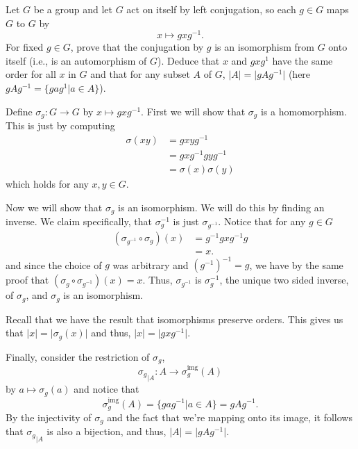 \documentclass[12 pt, letterpaper]{hmcpset}
\begin{document}
\pagebreak

\begin{problem}
	Let $G$ be a group and let $G$ act on itself by left conjugation, so each $g \in G$ maps $G$ to $G$ by
	\[
		x \mapsto g x g^{-1}.
	\]
	For fixed $g \in G$, prove that the conjugation by $g$ is an isomorphism from $G$ onto itself (i.e., is an automorphism of $G$). Deduce that $x$ and $g x g^{1}$ have the same order for all $x$ in $G$ and that for any subset $A$ of $G$, $\lvert A \rvert = \lvert g A g^{-1} \rvert$ (here $g A g^{-1} = \{ g a g^{1} | a \in A \} $).
\end{problem}

\begin{solution}
	Define $\sigma_g : G \to G$ by $x \mapsto g x g^{-1}$. First we will show that $\sigma_g$ is a homomorphism. This is just by computing
	\[
		\begin{split}
			\sigma(xy) & = g x y g^{-1} \\
				   & = g x g^{-1} g y g^{-1} \\
				   & = \sigma(x) \sigma(y)
		\end{split}
	\]
	which holds for any $x, y \in G$. 

	Now we will show that $\sigma_g$ is an isomorphism. We will do this by finding an inverse. We claim specifically, that $\sigma_g^{-1}$ is just $\sigma_{g^{-1}}$. Notice that for any $g \in G$
	\[
		\begin{split}
			(\sigma_{g^{-1}} \circ \sigma_g)(x) & = g^{-1} g x g^{-1} g \\
							    & = x.
		\end{split}
	\]
	and since the choice of $g$ was arbitrary and $(g^{-1})^{-1} = g$, we have by the same proof that $(\sigma_g \circ \sigma_{g^{-1}})(x) = x$. Thus, $\sigma_{g^{-1}}$ is $\sigma_g^{-1}$, the unique two sided inverse, of $\sigma_g$, and $\sigma_g$ is an isomorphism. 

	Recall that we have the result that isomorphisms preserve orders. This gives us that $\lvert x \rvert = \lvert \sigma_g(x) \rvert$ and thus, $\lvert x \rvert = \lvert g x g^{-1} \rvert$. 

	Finally, consider the restriction of $\sigma_g$, 
	\[
		{\sigma_g}_{|A} : A \to \sigma_g^\text{img}(A)
	\]
	by $a \mapsto \sigma_g(a)$ and notice that
	\[
		\sigma_g^\text{img}(A) = \{ g a g^{-1} | a \in A \} = g A g^{-1}.
	\]
	By the injectivity of $\sigma_g$ and the fact that we're mapping onto its image, it follows that ${\sigma_g}_{|A}$ is also a bijection, and thus, $\lvert A \rvert = \lvert g A g^{-1} \rvert$.
\end{solution}
\end{document}
